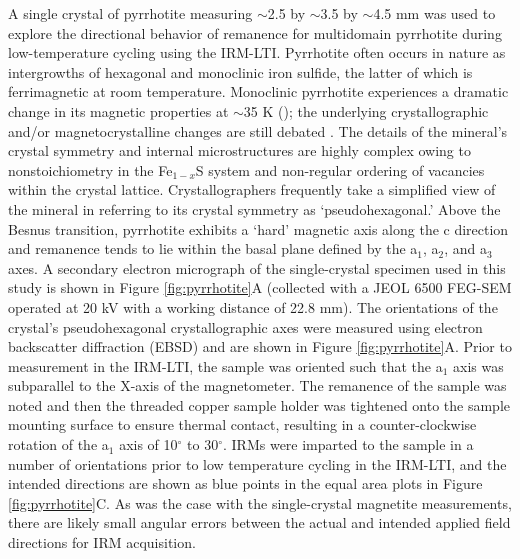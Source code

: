 \documentclass[draft,gc]{AGUTeX}
\begin{document}
\begin{article}
A single crystal of pyrrhotite measuring $\sim$2.5 by $\sim$3.5 by $\sim$4.5 mm was used to explore the directional behavior of remanence for multidomain pyrrhotite during low-temperature cycling using the IRM-LTI. Pyrrhotite often occurs in nature as intergrowths of hexagonal and monoclinic iron sulfide, the latter of which is ferrimagnetic at room temperature. Monoclinic pyrrhotite experiences a dramatic change in its magnetic properties at $\sim$35 K (\cite{Besnus1964a}); the underlying crystallographic and/or magnetocrystalline changes are still debated \citep{Wolfers2011a, Kind2013a}. The details of the mineral's crystal symmetry and internal microstructures are highly complex owing to nonstoichiometry in the Fe$_{1-x}$S system and non-regular ordering of vacancies within the crystal lattice.  Crystallographers frequently take a simplified view of the mineral in referring to its crystal symmetry as `pseudohexagonal.' Above the Besnus transition, pyrrhotite exhibits a `hard' magnetic axis along the c direction and remanence tends to lie within the basal plane defined by the a$_{1}$, a$_{2}$, and a$_{3}$ axes. A secondary electron micrograph of the single-crystal specimen used in this study is shown in Figure \ref{fig:pyrrhotite}A (collected with a JEOL 6500 FEG-SEM operated at 20 kV with a working distance of 22.8 mm). The orientations of the crystal's pseudohexagonal crystallographic axes were measured using electron backscatter diffraction (EBSD) and are shown in Figure \ref{fig:pyrrhotite}A. Prior to measurement in the IRM-LTI, the sample was oriented such that the a$_{1}$ axis was subparallel to the X-axis of the magnetometer.  The remanence of the sample was noted and then the threaded copper sample holder was tightened onto the sample mounting surface to ensure thermal contact, resulting in a counter-clockwise rotation of the a$_{1}$ axis of 10$^{\circ}$ to 30$^{\circ}$. IRMs were imparted to the sample in a number of orientations prior to low temperature cycling in the IRM-LTI, and the intended directions are shown as blue points in the equal area plots in Figure \ref{fig:pyrrhotite}C. As was the case with the single-crystal magnetite measurements, there are likely small angular errors between the actual and intended applied field directions for IRM acquisition.  


\end{article}
\end{document}
